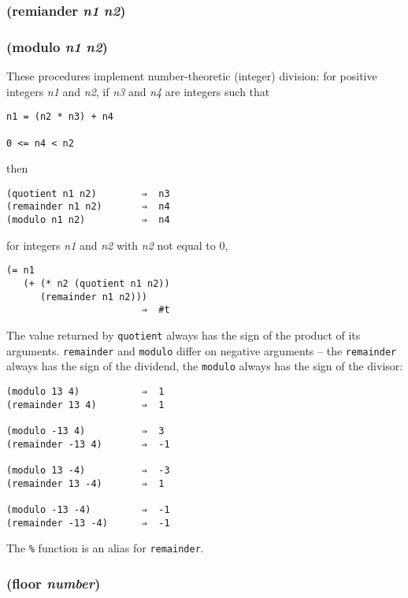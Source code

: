 \documentclass{article}
\begin{document}
\subsubsection{(remiander \emph{n1} \emph{n2})}

\subsubsection{(modulo \emph{n1} \emph{n2})}

These procedures implement number-theoretic (integer) division: for positive integers
\emph{n1} and \emph{n2}, if \emph{n3} and \emph{n4} are integers such that

\begin{verbatim}
n1 = (n2 * n3) + n4

0 <= n4 < n2
\end{verbatim}

then

\begin{verbatim}
(quotient n1 n2)        ⇒  n3
(remainder n1 n2)       ⇒  n4
(modulo n1 n2)          ⇒  n4
\end{verbatim}

for integers \emph{n1} and \emph{n2} with \emph{n2} not equal to 0,

\begin{verbatim}
(= n1
   (+ (* n2 (quotient n1 n2))
      (remainder n1 n2)))
                        ⇒  #t
\end{verbatim}

The value returned by \verb|quotient| always has the sign of the product of its arguments.
\verb|remainder| and \verb|modulo| differ on negative arguments -- the \verb|remainder|
always has the sign of the dividend, the \verb|modulo| always has the sign of the divisor:

\begin{verbatim}
(modulo 13 4)           ⇒  1
(remainder 13 4)        ⇒  1

(modulo -13 4)          ⇒  3
(remainder -13 4)       ⇒  -1

(modulo 13 -4)          ⇒  -3
(remainder 13 -4)       ⇒  1

(modulo -13 -4)         ⇒  -1
(remainder -13 -4)      ⇒  -1
\end{verbatim}

The \verb|%| function is an alias for \verb|remainder|.

\subsubsection{(floor \emph{number})}
\end{document}
